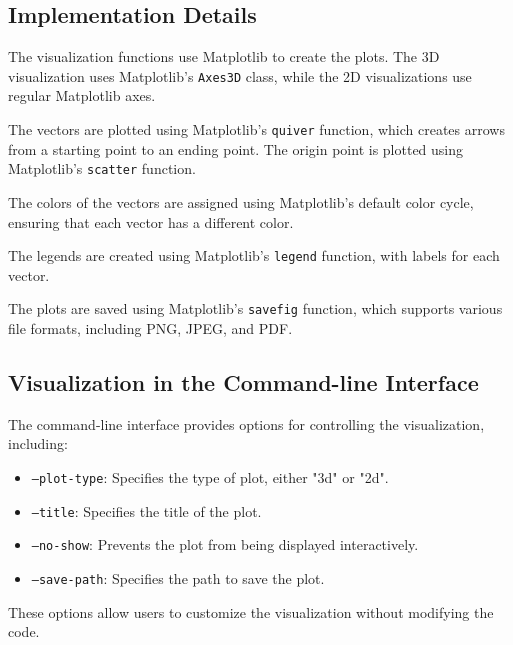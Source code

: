 \subsection{Implementation Details}

The visualization functions use Matplotlib to create the plots. The 3D visualization uses Matplotlib's \texttt{Axes3D} class, while the 2D visualizations use regular Matplotlib axes.

The vectors are plotted using Matplotlib's \texttt{quiver} function, which creates arrows from a starting point to an ending point. The origin point is plotted using Matplotlib's \texttt{scatter} function.

The colors of the vectors are assigned using Matplotlib's default color cycle, ensuring that each vector has a different color.

The legends are created using Matplotlib's \texttt{legend} function, with labels for each vector.

The plots are saved using Matplotlib's \texttt{savefig} function, which supports various file formats, including PNG, JPEG, and PDF.

\subsection{Visualization in the Command-line Interface}

The command-line interface provides options for controlling the visualization, including:

\begin{itemize}
    \item \texttt{--plot-type}: Specifies the type of plot, either "3d" or "2d".
    \item \texttt{--title}: Specifies the title of the plot.
    \item \texttt{--no-show}: Prevents the plot from being displayed interactively.
    \item \texttt{--save-path}: Specifies the path to save the plot.
\end{itemize}

These options allow users to customize the visualization without modifying the code.

